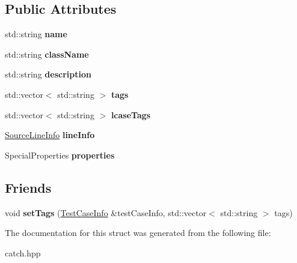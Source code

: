\subsection*{Public Attributes}
\begin{DoxyCompactItemize}
\item 
std\+::string {\bfseries name}\hypertarget{structCatch_1_1TestCaseInfo_a463794e2f5cfead307c93efd134ade36}{}\label{structCatch_1_1TestCaseInfo_a463794e2f5cfead307c93efd134ade36}

\item 
std\+::string {\bfseries class\+Name}\hypertarget{structCatch_1_1TestCaseInfo_a1a5e0825132a38d091defdebbf2f8ce9}{}\label{structCatch_1_1TestCaseInfo_a1a5e0825132a38d091defdebbf2f8ce9}

\item 
std\+::string {\bfseries description}\hypertarget{structCatch_1_1TestCaseInfo_a37fe2db9425bc45f6a33893eac31198e}{}\label{structCatch_1_1TestCaseInfo_a37fe2db9425bc45f6a33893eac31198e}

\item 
std\+::vector$<$ std\+::string $>$ {\bfseries tags}\hypertarget{structCatch_1_1TestCaseInfo_a150a7cbca1dd0c91799ccb14ff822eb0}{}\label{structCatch_1_1TestCaseInfo_a150a7cbca1dd0c91799ccb14ff822eb0}

\item 
std\+::vector$<$ std\+::string $>$ {\bfseries lcase\+Tags}\hypertarget{structCatch_1_1TestCaseInfo_a844e3de9baf6e53cadfba9733c236bfe}{}\label{structCatch_1_1TestCaseInfo_a844e3de9baf6e53cadfba9733c236bfe}

\item 
\hyperlink{structCatch_1_1SourceLineInfo}{Source\+Line\+Info} {\bfseries line\+Info}\hypertarget{structCatch_1_1TestCaseInfo_aa9407b7f442655b51a2aad24b3fa2fd3}{}\label{structCatch_1_1TestCaseInfo_aa9407b7f442655b51a2aad24b3fa2fd3}

\item 
Special\+Properties {\bfseries properties}\hypertarget{structCatch_1_1TestCaseInfo_afc1e84bd7a2e180895a06d9131302af0}{}\label{structCatch_1_1TestCaseInfo_afc1e84bd7a2e180895a06d9131302af0}

\end{DoxyCompactItemize}
\subsection*{Friends}
\begin{DoxyCompactItemize}
\item 
void {\bfseries set\+Tags} (\hyperlink{structCatch_1_1TestCaseInfo}{Test\+Case\+Info} \&test\+Case\+Info, std\+::vector$<$ std\+::string $>$ tags)\hypertarget{structCatch_1_1TestCaseInfo_a0fe44abaf18ae7c26f98a9fc2b08679c}{}\label{structCatch_1_1TestCaseInfo_a0fe44abaf18ae7c26f98a9fc2b08679c}

\end{DoxyCompactItemize}


The documentation for this struct was generated from the following file\+:\begin{DoxyCompactItemize}
\item 
catch.\+hpp\end{DoxyCompactItemize}
